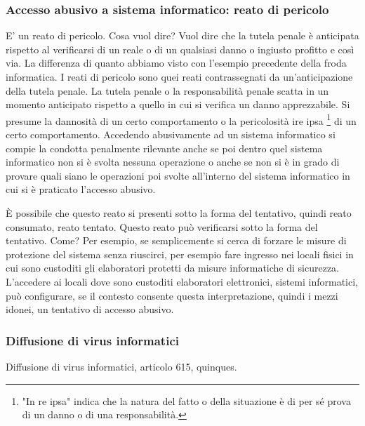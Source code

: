 \subsubsection{Accesso abusivo a sistema informatico: reato di pericolo}
E' un reato di pericolo. Cosa vuol dire? Vuol dire che la tutela penale è anticipata rispetto al verificarsi di un reale o di un qualsiasi danno o ingiusto profitto e così via. 
La differenza di quanto abbiamo visto con l'esempio precedente della froda informatica. I reati di pericolo sono quei reati contrassegnati da un'anticipazione della tutela penale. 
La tutela penale o la responsabilità penale scatta in un momento anticipato rispetto a quello in cui si verifica un danno apprezzabile. Si presume la dannosità di un certo comportamento o la pericolosità ire ipsa \footnote{"In re ipsa" indica che la natura del fatto o della situazione è di per sé prova di un danno o di una responsabilità.} di un certo comportamento. 
Accedendo abusivamente ad un sistema informatico si compie la condotta penalmente rilevante anche se poi dentro quel sistema informatico non si è svolta nessuna operazione o anche se non si è in grado di provare quali siano le operazioni poi svolte all'interno del sistema informatico in cui si è praticato l'accesso abusivo.

È possibile che questo reato si presenti sotto la forma del tentativo, quindi reato consumato, reato tentato. Questo reato può verificarsi sotto la forma del tentativo. Come? Per esempio, se semplicemente si cerca di forzare le misure di protezione del sistema senza riuscirci, per esempio fare ingresso nei locali fisici in cui sono custoditi gli elaboratori protetti da misure informatiche di sicurezza. L'accedere ai locali dove sono custoditi elaboratori elettronici, sistemi informatici, può configurare, se il contesto consente questa interpretazione, quindi i mezzi idonei, un tentativo di accesso abusivo. 


\subsubsection{Diffusione di virus informatici}
Diffusione di virus informatici, articolo 615, quinques. 

